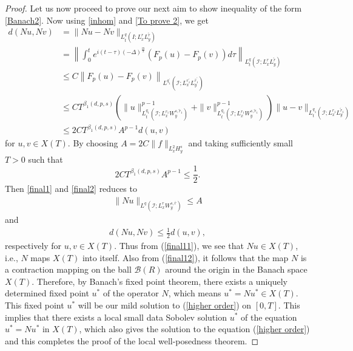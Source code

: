 \documentclass[10pt,a4paper]{amsart}
\begin{document}
\begin{proof}
		Let us now proceed to prove our next aim to show inequality of the form \eqref{Banach2}.  	 Now using  
		\eqref{inhom} and \eqref{To prove 2}, we get 
		\begin{align}\label{final2}\nonumber
			d(Nu, Nv) & =\|Nu-Nv\|_{L_t^q\left(I ; L_x^r L_y^{\tilde{r}}\right)}\\\nonumber
			&=\left\|\int_0^t e^{i(t-\tau)  (-\Delta)^{\frac{m}{2}}} \left( F_p(u)- F_p(v) \right)d \tau\right\|_{L_t^q\left(\mathcal{I} ; L_x^r L_y^{\tilde{r}}\right)} \\\nonumber
			& \leq C\left\|F_p(u)-F_p(v)\right\|_{L^{q_1^{\prime}}\left(\mathcal{I} ; L_x^{r_1^{\prime}} L_y^{\bar{r}_1^{\prime}}\right)}\\\nonumber
			&\leq C T^{\beta_1(d, p, s)}  \left(\|u\|_{L_t^{q_1}\left(\mathcal{I}; L_x^{r_1} W_y^{s, \tilde{r}_1}\right)}^{p-1}+\|v\|_{L_t^{q_1}\left(\mathcal{I} ; L_x^{r_1} W_y^{s, \tilde{r}_1}\right)}^{p-1}\right)\|u-v\|_{L_t^{q_1}\left(\mathcal{I}; L_x^{r_1} L_y^{\tilde{r}_1}\right)}\\ 				
			& \leq 2 C T^{\beta_1(d, p, s)} A^{p-1} d(u, v)
		\end{align} 	for $u, v \in X(T)$.  By choosing $A=2 C\|f\|_{L_x^2 H_y^s}$ and taking  sufficiently small $T>0$  such  that
		$$
		2 C T^{\beta_1(d, p, s)} A^{p-1} \leq \frac{1}{2}.
		$$
		Then \eqref{final1} and \eqref{final2}	 reduces to 	  
		\begin{align}\label{final11}
			\|Nu\|_{L^q\left(\mathcal{I} ; L_x^r W_y^{s, \bar{r}}\right)} \leq A
		\end{align}
		and  	 \begin{align}\label{final12}
			d(Nu, Nv)  \leq \frac{1}{2} d(u, v),
		\end{align}
		respectively 	for $u, v\in X(T).$  Thus from (\ref{final11}), we see that  $Nu \in X(T)$, i.e.,  $N$ maps $X(T)$ into itself. 
		Also from (\ref{final12}),  it follows that the map $N$ is a contraction mapping on the ball $\mathcal{B}(R)$ around the origin in the Banach space $X(T)$. Therefore, by Banach's fixed point theorem,  there exists a uniquely determined fixed point $u^*$ of the operator $N$, which means $u^*=Nu^* \in X(T)$.  This fixed point $u^*$ will be  our mild solution to (\ref{higher order})    on $[0, T]$. This implies that there exists a local   small data Sobolev solution $u^*$ of the equation $ u^*=Nu^* $ in $ X(T)$, which also gives the solution to the   equation (\ref{higher order})  and this completes the proof of the local well-posedness theorem. 
	\end{proof}
\end{document}
